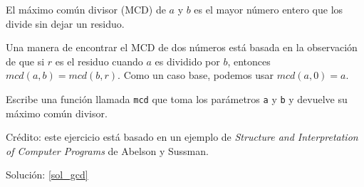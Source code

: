 \begin{exercise}
\label{gcd}

El máximo común divisor (MCD) de $a$ y $b$ es el mayor número entero
que los divide sin dejar un residuo.

Una manera de encontrar el MCD de dos números está basada en la
observación de que si $r$ es el residuo cuando $a$ es dividido por $b$,
entonces $mcd(a,b) = mcd(b,r)$. Como un caso base, podemos usar 
$mcd(a, 0) = a$.

Escribe una función llamada \verb|mcd| que toma los parámetros 
{\tt a} y {\tt b} y devuelve su máximo común divisor.

Crédito: este ejercicio está basado en un ejemplo de 
{\em Structure and Interpretation of Computer Programs}
de Abelson y Sussman.

Solución: \ref{sol_gcd}

\end{exercise}

